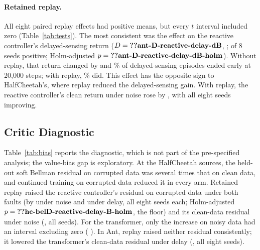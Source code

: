 \paragraph{Retained replay.} All eight paired replay effects had positive means, but every $t$ interval included zero (Table~\ref{tab:tests}). The most consistent was the effect on the reactive controller's delayed-sensing return ($D=\R{ant-D-reactive-delay-dB}$, ;  of 8 seeds positive; Holm-adjusted $p=\R{ant-D-reactive-delay-dB-holm}$). Without replay, that return changed by  and \% of delayed-sensing episodes ended early at 20,000 steps; with replay, \% did. This effect has the opposite sign to HalfCheetah's, where replay reduced the delayed-sensing gain. With replay, the reactive controller's clean return under noise rose by  , with all eight seeds improving.



\subsection{Critic Diagnostic}
Table~\ref{tab:bias} reports the diagnostic, which is not part of the pre-specified analysis; the value-bias gap is exploratory. At the HalfCheetah sources, the held-out soft Bellman residual on corrupted data was several times that on clean data, and continued training on corrupted data reduced it in every arm. Retained replay raised the reactive controller's residual on corrupted data under both faults (by  under noise and  under delay, all eight seeds each; Holm-adjusted $p=\R{hc-belD-reactive-delay-B-holm}$, the floor) and its clean-data residual under noise (, all seeds). For the transformer, only the increase on noisy data had an interval excluding zero ( ). In Ant, replay raised neither residual consistently; it lowered the transformer's clean-data residual under delay (, all eight seeds).

